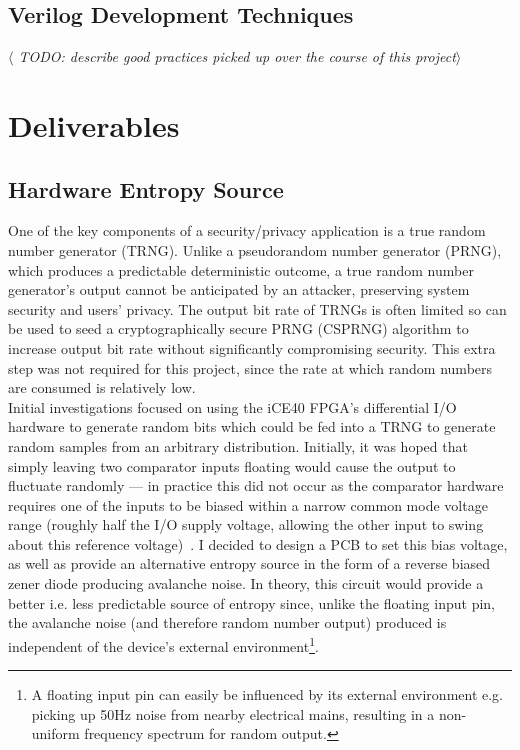 \documentclass[12pt]{article}
\begin{document}
  \subsection{Verilog Development Techniques}
    \textit{$\langle$ TODO: describe good practices picked up over the course of this project$\rangle$}

\newpage



%
%

\section{Deliverables}
  \subsection{Hardware Entropy Source}
    One of the key components of a security/privacy application is a true random number generator (TRNG). Unlike a pseudorandom number generator (PRNG), which produces a predictable deterministic outcome, a true random number generator's output cannot be anticipated by an attacker, preserving system security and users' privacy. The output bit rate of TRNGs is often limited so can be used to seed a cryptographically secure PRNG (CSPRNG) algorithm to increase output bit rate without significantly compromising security. This extra step was not required for this project, since the rate at which random numbers are consumed is relatively low.\\

    Initial investigations focused on using the iCE40 FPGA's differential I/O hardware to generate random bits which could be fed into a TRNG to generate random samples from an arbitrary distribution. Initially, it was hoped that simply leaving two comparator inputs floating would cause the output to fluctuate randomly --- in practice this did not occur as the comparator hardware requires one of the inputs to be biased within a narrow common mode voltage range (roughly half the I/O supply voltage, allowing the other input to swing about this reference voltage)~\cite{ice40_diff_io}. I decided to design a PCB to set this bias voltage, as well as provide an alternative entropy source in the form of a reverse biased zener diode producing avalanche noise. In theory, this circuit would provide a better i.e. less predictable source of entropy since, unlike the floating input pin, the avalanche noise (and therefore random number output) produced is independent of the device's external environment\footnote{A floating input pin can easily be influenced by its external environment e.g. picking up 50Hz noise from nearby electrical mains, resulting in a non-uniform frequency spectrum for random output.}.\\
\end{document}
